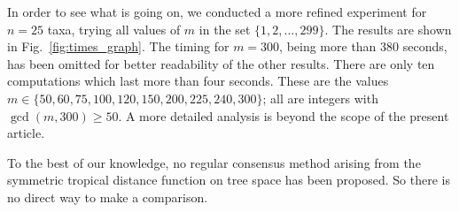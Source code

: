 \documentclass[a4paper,12pt]{amsart}
\theoremstyle{remark}
\begin{document}
In order to see what is going on, we conducted a more refined experiment for $n=25$ taxa, trying all values of $m$ in the set $\{1,2,\dots,299\}$.
The results are shown in Fig.~\ref{fig:times_graph}.
The timing for $m=300$, being more than 380 seconds, has been omitted for better readability of the other results.
There are only ten computations which last more than four seconds.
These are the values $m\in\{50,60,75,100,120,150,200,225,240,300\}$; all are integers with $\gcd(m,300)\geq 50$.
A more detailed analysis is beyond the scope of the present article.

To the best of our knowledge, no regular consensus method arising from the symmetric tropical distance function on tree space has been proposed. %
So there is no direct way to make a comparison.



\end{document}
